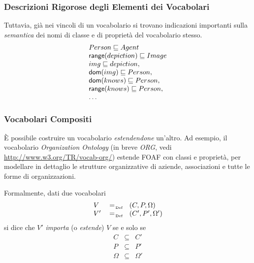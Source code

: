 \documentclass[8pt]{beamer}
\begin{document}
\begin{frame}
\frametitle{Descrizioni Rigorose degli Elementi dei Vocabolari}
Tuttavia, gi\`a nei vincoli di un vocabolario si trovano indicazioni importanti
sulla \emph{semantica} dei nomi di classe e di propriet\`a del vocabolario stesso.
\[
\begin{array}{l}
Person \sqsubseteq Agent\\
\mathsf{range}(depiction) \sqsubseteq Image\\
img \sqsubseteq depiction, \\
\mathsf{dom}(img) \sqsubseteq Person,\\
\mathsf{dom}(knows) \sqsubseteq Person,\\
\mathsf{range}(knows) \sqsubseteq Person,\\
\ldots
\end{array}
\]
\end{frame}

\begin{frame}
\frametitle{Vocabolari Compositi}

\`E possibile costruire un vocabolario \emph{estendendone} un'altro.
Ad esempio, il vocabolario \emph{Organization Ontology} (in breve \emph{ORG}, vedi \url{http://www.w3.org/TR/vocab-org/})
estende FOAF con classi e propriet\`a, per modellare in dettaglio 
le strutture organizzative di aziende, associazioni e tutte le forme 
di organizzazioni.
\vspace{\baselineskip}

Formalmente, dati due vocabolari
\[
 \begin{array}{lcl}
 V & \defAs & (C, P, \Omega) \\ 
 V' & \defAs & (C', P', \Omega')
 \end{array}
\]
si dice che $V'$ \emph{importa} (o \emph{estende}) $V$ se e 
solo se
\[
 \begin{array}{rcl}
 C & \subseteq & C' \\
 P & \subseteq & P' \\
 \Omega & \subseteq & \Omega'  
\end{array} 
\]
\end{frame}

\newcommand{\org}{\mathtt{ORG}}
\end{document}
